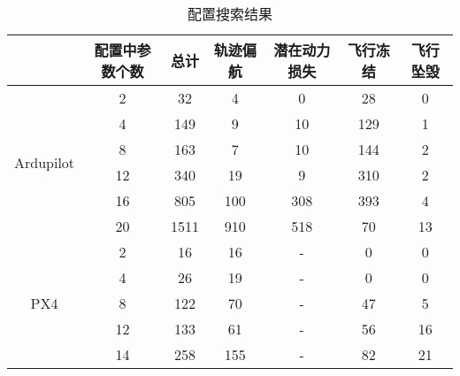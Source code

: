 \begin{table}[ht]
\caption{配置搜索结果}
\label{tab:fix_lgd}
\centering
\begin{threeparttable}
\begin{tabular}{c|c|c|cccc}
        \toprule[1.5pt]
        ~ & 配置中参数个数  & 总计 & 轨迹偏航 & 潜在动力损失 & 飞行冻结 & 飞行坠毁\\
        
        \midrule[0.8pt]
        
        \multirow{6}{*}{{Ardupilot}} &2 & 32 & 4 & 0 & 28 & 0 \\

        ~ & 4 & 149  & 9  & 10 & 129 & 1 \\
        
        ~ & 8 & 163  & 7 & 10 & 144 & 2 \\
    
        ~ & 12  & 340 & 19 & 9 & 310 & 2  \\
        
        ~ & 16  & 805 & 100 & 308 & 393 & 4  \\
        
        ~ & 20  & 1511 & 910 & 518 & 70 & 13  \\
        
        \midrule[0.8pt]
        
        \multirow{5}{*}{{PX4}} & 2 & 16 & 16 & - & 0 & 0 \\
        
        ~ & 4 & 26 & 19 & - & 0 & 0 \\
        
         ~ & 8 & 122  & 70  & - & 47 & 5 \\
        
        ~ & 12 & 133  & 61 & - & 56 & 16 \\
    
        ~ & 14  & 258 & 155  & - & 82 & 21  \\
        \bottomrule[1.5pt]
\end{tabular}

\end{threeparttable}
\end{table}
